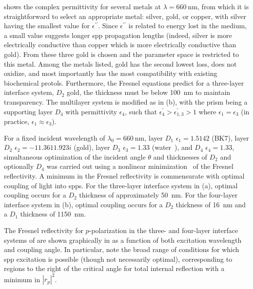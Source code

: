  shows the complex permittivity for several metals
at $\lambda=\SI{660}{\nano\meter}$, from which it is straightforward to
select an appropriate metal: silver, gold, or copper, with silver having
the smallest value for $\epsilon^{\prime\prime}$.  Since
$\epsilon^{\prime\prime}$ is related to energy lost in the medium, a small
value suggests longer \gls{spp} propagation lengths (indeed, silver is more
electrically conductive than copper which is more electrically conductive
than gold).  From these three gold is chosen and the parameter space is
restricted to this metal.  Among the metals listed, gold has the second
lowest loss, does not oxidize, and most importantly has the most
compatibility with existing biochemical protols.  Furthermore, the Fresnel
equations predict for a three-layer interface system, $D_2$ gold, the
thickness must be below \SI{100}{\nano\meter} to maintain transparency.
The multilayer system is modified as in (b),
with the prism being a supporting layer $D_4$ with permittivity
$\epsilon_4$, such that $\epsilon^\prime_4>\epsilon^\prime_{1,3}>1$ where
$\epsilon_1=\epsilon_3$ (in practice, $\epsilon_1\approx\epsilon_3$).

For a fixed incident wavelength of $\lambda_0=\SI{660}{\nano\meter}$, layer
$D_1$ $\epsilon_1=1.5142$ (BK7), layer $D_2$
$\epsilon_2=\num{-11.361+1.923i}$ (gold), layer $D_3$ $\epsilon_3=1.33$
(water~\cite{andreasson1971measurement}), and $D_4$ $\epsilon_4=1.33$,
simultaneous optimization of the incident angle $\theta$ and thicknesses of
$D_2$ and optionally $D_4$ was carried out using a nonlinear
minimization~\cite{brent1973algorithms} of the Fresnel reflectivity.  A
minimum in the Fresnel reflectivity is commensurate with optimal coupling
of light into \glspl{spp}.  For the three-layer interface system in
(a), optimal coupling occurs for a $D_2$
thickness of approximately \SI{50}{\nano\meter}.  For the four-layer
interface system in (b), optimal coupling
occurs for a $D_2$ thickness of \SI{16}{\nano\meter} and a $D_1$ thickness
of \SI{1150}{\nano\meter}.

The Fresnel reflectivity for $p$-polarization in the three- and four-layer
interface systems of  are shown graphically
in  as a function of both excitation wavelength
and coupling angle.  In particular, note the broad range of conditions for
which \gls{spp} excitation is possible (though not necessarily optimal),
corresponding to regions to the right of the critical angle for total
internal reflection with a minimum in $|r_p|^2$.

